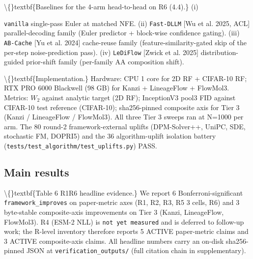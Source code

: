 \documentclass[preprint,3p,times,twocolumn]{elsarticle}
\begin{document}
\textbackslash\{\}textbf\{Baselines for the 4-arm head-to-head on R6 (4.4).\} (i)

\texttt{vanilla}  single-pass Euler at matched NFE. (ii) \texttt{Fast-DLLM} [Wu et al. 2025, ACL]  parallel-decoding family (Euler predictor + block-wise confidence gating). (iii) \texttt{AB-Cache} [Yu et al. 2024]  cache-reuse family (feature-similarity-gated skip of the per-step noise-prediction pass). (iv) \texttt{LeDiFlow} [Zwick et al. 2025]  distribution-guided prior-shift family (per-family AA composition shift).

\textbackslash\{\}textbf\{Implementation.\} Hardware: CPU 1 core for 2D RF + CIFAR-10 RF; RTX PRO 6000 Blackwell (98 GB) for Kanzi + LineageFlow + FlowMol3. Metrics: $W_2$ against analytic target (2D RF); InceptionV3 pool3 FID against CIFAR-10 test reference (CIFAR-10); sha256-pinned composite axis for Tier 3 (Kanzi / LineageFlow / FlowMol3). All three Tier 3 sweeps ran at N=1000 per arm. The 80 round-2 framework-external uplifts (DPM-Solver++, UniPC, SDE, stochastic FM, DOPRI5) and the 36 algorithm-uplift isolation battery (\texttt{tests/test\_algorithm/test\_uplifts.py}) PASS.

\subsection{Main results}
\textbackslash\{\}textbf\{Table 6  R1R6 headline evidence.\} We report 6 Bonferroni-significant \texttt{framework\_improves} on paper-metric axes (R1, R2, R3, R5  3 cells, R6) and 3 byte-stable composite-axis improvements on Tier 3 (Kanzi, LineageFlow, FlowMol3). R4 (ESM-2 NLL) is \texttt{not yet measured} and is deferred to follow-up work; the R-level inventory therefore reports 5 ACTIVE paper-metric claims and 3 ACTIVE composite-axis claims. All headline numbers carry an on-disk sha256-pinned JSON at \texttt{verification\_outputs/} (full citation chain in supplementary).
\end{document}
